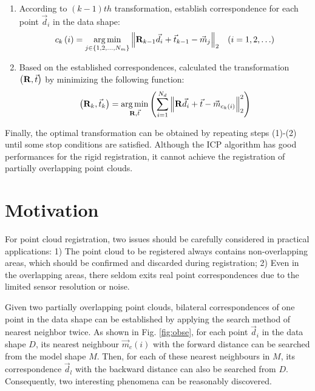 \documentclass[review]{elsarticle}
\begin{document}
\begin{enumerate}[(1)]
\item According to $\left( {k - 1} \right)th$ transformation, establish correspondence for each point ${\vec d _i}$ in the data shape:
\begin{equation}
{c_k}\left( i \right) = \mathop {\arg \min }\limits_{j \in \left\{ {1,2, \ldots ,{N_m}} \right\}} {\left\| {{{\bf{R}}_{k - 1}}{{\vec d }_i} + {{\vec t }_{k - 1}} - {{\vec m }_j}} \right\|_2} \quad(i= 1,2, \ldots)
\label{eq:ICPCorr}
\end{equation}

\item Based on the established correspondences, calculated the transformation $\left( {{\bf{R}},\vec t } \right)$ by minimizing the following function:
\begin{equation}
\left( {{{\bf{R}}_k},{{\vec t }_k}} \right) = \mathop {\arg \min }\limits_{{\bf{R}},\vec t } \left( {\sum\limits_{i = 1}^{{N_d}} {\left\| {{\bf{R}}{{\vec d }_i} + \vec t  - {{\vec m }_{{c_k}\left( i \right)}}} \right\|_2^2} } \right)
\label{eq:ICPTrans}
\end{equation}

\end{enumerate}

Finally, the optimal transformation can be obtained by repeating steps (1)-(2) until some stop conditions are satisfied. Although the ICP algorithm has good performances for the rigid registration, it cannot achieve the registration of partially
overlapping point clouds.


\section{Motivation}

For point cloud registration, two issues should be carefully considered in practical applications: 1) The point cloud to be registered always contains non-overlapping areas, which should be confirmed and discarded during registration; 2) Even in the overlapping areas, there seldom exits real point correspondences due to the limited sensor resolution or noise.

Given two partially overlapping point clouds, bilateral correspondences of one point in the data shape can be established by applying the search method of nearest neighbor twice. As shown in Fig. \ref{fig:obse}, for each point ${\vec d}_i $ in the data shape $D$, its nearest neighbour ${\vec m}_c(i) $ with the forward distance can be searched from the model shape $M$. Then, for each of these nearest neighbours in $M$, its correspondence ${\vec d}_l $ with the backward distance can also be searched from $D$. Consequently, two interesting phenomena can be reasonably discovered.
\end{document}
